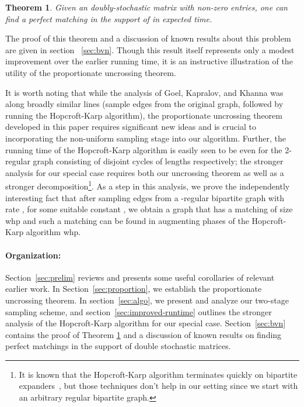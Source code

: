 \documentclass[11pt]{article}
\newtheorem{theorem}{Theorem}[section]
\begin{document}
\begin{theorem} \label{thm:bvn}
  Given an  doubly-stochastic matrix  with  non-zero
  entries, one can find a perfect matching in the support of  in
   expected time.
\end{theorem}

The proof of this theorem and a discussion of known results about this problem are given in section ~\ref{sec:bvn}. Though this
result itself represents only a modest improvement over the earlier 
running time, it is an instructive illustration of the utility of the
proportionate uncrossing theorem.

It is worth noting that while the analysis of Goel, Kapralov, and Khanna was
along broadly similar lines (sample edges from the original graph, followed by
running the Hopcroft-Karp algorithm), the proportionate uncrossing theorem
developed in this paper requires significant new ideas and is crucial to
incorporating the non-uniform sampling stage into our algorithm. Further, the
running time of the Hopcroft-Karp algorithm is easily seen to be
 even for the 2-regular graph consisting of
 disjoint cycles of lengths 
respectively; the stronger analysis for our special case requires both our
uncrossing theorem as well as a stronger decomposition\footnote{It is known
  that the Hopcroft-Karp algorithm terminates quickly on bipartite
  expanders~\cite{motwani}, but those techniques don't help in our setting
  since we start with an arbitrary regular bipartite graph.}. As a step in
this analysis, we prove the independently interesting fact that after sampling
edges from a -regular bipartite graph with rate , for some
suitable constant , we obtain a graph that has a matching of size
 whp and such a matching can be found in  augmenting phases
of the Hopcroft-Karp algorithm whp.

\noindent
\paragraph{Organization:}
Section~\ref{sec:prelim} reviews and presents some useful corollaries of
relevant earlier work. In Section~\ref{sec:proportion}, we establish the
proportionate uncrossing theorem. In section~\ref{sec:algo}, we
present and analyze our two-stage sampling scheme, and
section~\ref{sec:improved-runtime} outlines the stronger analysis of the
Hopcroft-Karp algorithm for our special case. Section~\ref{sec:bvn} contains the proof of Theorem \ref{thm:bvn}
and a discussion of known results on finding perfect matchings in the support of double stochastic matrices.
\end{document}
